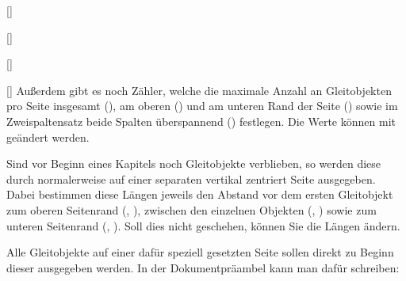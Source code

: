 \documentclass[%
  english,ngerman,%
  headings=optiontoheadandtoc,captions=tableheading,numbers=noenddot,%
  chapterpage,cdfoot,%
]{tudscrman}
\begin{document}
\begin{Declaration}{}[]
\begin{Declaration}{}[]
\begin{Declaration}{}[]
\begin{Declaration}{}[]
\printdeclarationlist*
%
Außerdem gibt es noch Zähler, welche die maximale Anzahl an Gleitobjekten pro 
Seite insgesamt (), am oberen () und 
am unteren Rand der Seite () sowie im Zweispaltensatz 
beide Spalten überspannend () festlegen. Die Werte können 
mit  geändert werden.
\end{Declaration}
\end{Declaration}
\end{Declaration}
\end{Declaration}

\begin{Declaration}{}
\begin{Declaration}{}
\begin{Declaration}{}
\begin{Declaration}{}
\begin{Declaration}{}
\begin{Declaration}{}
\printdeclarationlist*
%
Sind vor Beginn eines Kapitels noch Gleitobjekte verblieben, so werden diese 
durch  normalerweise auf einer separaten vertikal zentriert Seite 
ausgegeben. Dabei bestimmen diese Längen jeweils den Abstand vor dem ersten 
Gleitobjekt zum oberen Seitenrand (, ), 
zwischen den einzelnen Objekten (, ) sowie 
zum unteren Seitenrand (, ). Soll dies nicht 
geschehen, können Sie die Längen ändern.
\end{Declaration}
\end{Declaration}
\end{Declaration}
\end{Declaration}
\end{Declaration}
\end{Declaration}

\begin{Example}
Alle Gleitobjekte auf einer dafür speziell gesetzten Seite sollen direkt zu 
Beginn dieser ausgegeben werden. In der Dokumentpräambel kann man dafür 
schreiben:
\begin{code}
\makeatletter
\setlength{\@fptop}{0pt}
\setlength{\@dblfptop}{0pt} %
\makeatother
\end{code}
\end{Example}
\end{document}
